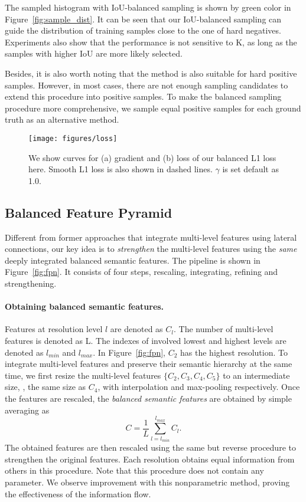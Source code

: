 \documentclass[10pt,twocolumn,letterpaper]{article}
\begin{document}
The sampled histogram with IoU-balanced sampling is shown by green color in Figure~\ref{fig:sample_dist}.
It can be seen that our IoU-balanced sampling can guide the distribution of training samples close to the one of hard negatives.
Experiments also show that the performance is not sensitive to K,
as long as the samples with higher IoU are more likely selected.

Besides, it is also worth noting that the method is also suitable for hard positive samples.
However, in most cases, there are not enough sampling candidates to extend this procedure into positive samples.
To make the balanced sampling procedure more comprehensive,
we sample equal positive samples for each ground truth as an alternative method.


\begin{figure*}
	\centering
	\texttt{[image: figures/loss]}
	\caption{We show curves for (a) gradient and (b) loss of our balanced L1 loss here. Smooth L1 loss is also shown in dashed lines. $\gamma$ is set default as 1.0.}
	\label{fig:loss}
	\vspace{-10pt}
\end{figure*}

\subsection{Balanced Feature Pyramid}
Different from former approaches\cite{fpn,panet} that integrate multi-level features using lateral connections,
our key idea is to \emph{strengthen} the multi-level features using the \emph{same} deeply integrated balanced semantic features.
The pipeline is shown in Figure~\ref{fig:fpn}.
It consists of four steps, rescaling, integrating, refining and strengthening.

\vspace{-12pt}
\paragraph{Obtaining balanced semantic features.}
Features at resolution level $l$ are denoted as $C_l$.
The number of multi-level features is denoted as L.
The indexes of involved lowest and highest levels are denoted as $l_{min}$ and $l_{max}$.
In Figure~\ref{fig:fpn}, $C_2$ has the highest resolution.
To integrate multi-level features and preserve their semantic hierarchy at the same time, we first resize the multi-level features $\{C_{2}, C_{3}, C_{4}, C_{5}\}$ to an intermediate size, \ie, the same size as $C_{4}$, with interpolation and max-pooling respectively.
Once the features are rescaled, the \emph{balanced semantic features} are obtained by simple averaging as
\begin{equation}
	\label{equ:IDFeat}
	C = \frac{1}{L}\sum_{l=l_{min}}^{l_{max}}{C_{l}}.
\end{equation}
The obtained features are then rescaled using the same but reverse procedure to strengthen the original features.
Each resolution obtains equal information from others in this procedure.
Note that this procedure does not contain any parameter.
We observe improvement with this nonparametric method, proving the effectiveness of the information flow.
\end{document}
